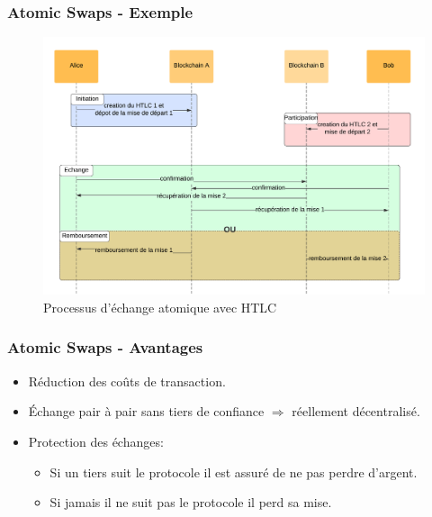 \begin{frame}
	\frametitle{Atomic Swaps - Exemple}
	\begin{figure}
		\includegraphics[scale = 0.10]{decentralisation/atomicSwap.png}
		\caption{Processus d'échange atomique avec HTLC}
	\end{figure}

\end{frame}

\begin{frame}
	\frametitle{Atomic Swaps - Avantages}
	\subtitle{Avantages}
	\begin{itemize}
		\item Réduction des coûts de transaction.
		\item Échange pair à pair sans tiers de confiance $\Rightarrow$ réellement décentralisé.
		\item Protection des échanges:
		      \begin{itemize}
			      \item Si un tiers suit le protocole il est assuré de ne pas perdre d'argent.
			      \item Si jamais il ne suit pas le protocole il perd sa mise.
		      \end{itemize}
	\end{itemize}
\end{frame}

